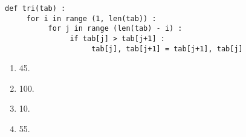 %
%

\begin{lstlisting}
def tri(tab) :
     for i in range (1, len(tab)) :
          for j in range (len(tab) - i) :
               if tab[j] > tab[j+1] :
                    tab[j], tab[j+1] = tab[j+1], tab[j]
\end{lstlisting}
\begin{enumerate}
\item 45. %
\item 100.
\item 10.
\item 55.
\end{enumerate}

